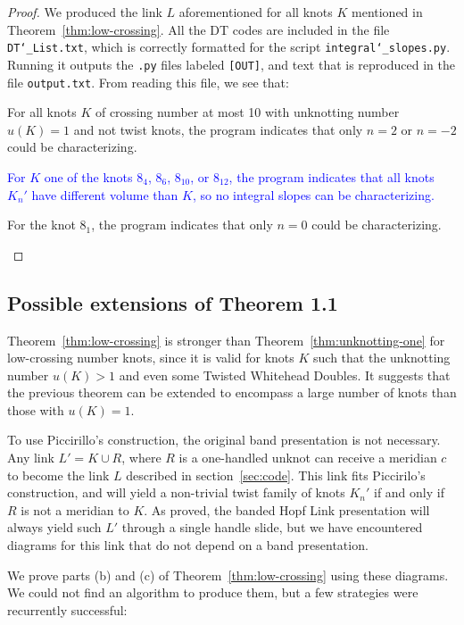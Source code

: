 \documentclass[11pt,usenames,dvipsnames,reqno]{amsart}
\numberwithin{theorem}{section}
\theoremstyle{ex}
\theoremstyle{rem}
\def\kh#1{\textcolor{Blue}{#1}}
\begin{document}
\begin{proof} We produced the link $L$ aforementioned for all knots $K$ mentioned in Theorem~\ref{thm:low-crossing}. All the DT codes are included in the file \texttt{DT\char`_List.txt}, which is correctly formatted for the script \texttt{integral\char`_slopes.py}. Running it outputs the \texttt{.py} files labeled \texttt{[OUT]}, and text that is reproduced in the file \texttt{output.txt}. From reading this file, we see that:
	\begin{enumerate}[label=\normalfont (\alph*)]
		\item For all knots $K$ of crossing number at most 10 with unknotting number $u(K) = 1$ and not twist knots, the program indicates that only $n = 2$ or $n = -2$ could be characterizing.
		\kh{\item For $K$ one of the knots $8_4$, $8_6$, $8_{10}$, or $8_{12}$, the program indicates that all knots $K_{n}'$ have different volume than $K$, so no integral slopes can be characterizing.}
		\item For the knot $8_1$, the program indicates that only $n = 0$ could be characterizing.
	\end{enumerate}
\end{proof}

\subsection{Possible extensions of Theorem 1.1}

Theorem~\ref{thm:low-crossing} is stronger than Theorem~\ref{thm:unknotting-one} for low-crossing number knots, since it is valid for knots $K$ such that the unknotting number $u(K) > 1$ and even some Twisted Whitehead Doubles. It suggests that the previous theorem can be extended to encompass a large number of knots than those with $u(K)=1$.

To use Piccirillo's construction, the original band presentation is not necessary. Any link $L' = K\cup R$, where $R$ is a one-handled unknot can receive a meridian $c$ to become the link $L$ described in section~\ref{sec:code}. This link fits Piccirilo's construction, and will yield a non-trivial twist family of knots $K_{n}'$ if and only if $R$ is not a meridian to $K$. As proved, the banded Hopf Link presentation will always yield such $L'$ through a single handle slide, but we have encountered diagrams for this link that do not depend on a band presentation.

We prove parts (b) and (c) of Theorem~\ref{thm:low-crossing} using these diagrams. We could not find an algorithm to produce them, but a few strategies were recurrently successful:
\end{document}
